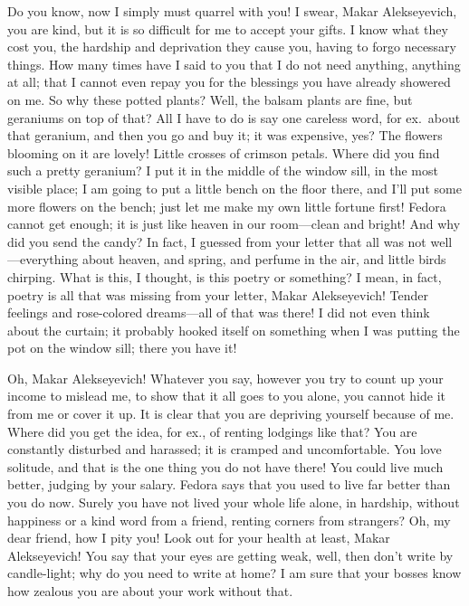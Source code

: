 Do you know, now I simply must quarrel with you! I swear, Makar Alekseyevich, you are kind, but it is so difficult for me to accept your gifts. I know what they cost you, the hardship and deprivation they cause you, having to forgo necessary things. How many times have I said to you that I do not need anything, anything at all; that I cannot even repay you for the blessings you have already showered on me. So why these potted plants? Well, the balsam plants are fine, but geraniums on top of that? All I have to do is say one careless word, for ex.~about that geranium, and then you go and buy it; it was expensive, yes? The flowers blooming on it are lovely! Little crosses of crimson petals. Where did you find such a pretty geranium? I put it in the middle of the window sill, in the most visible place; I am going to put a little bench on the floor there, and I'll put some more flowers on the bench; just let me make my own little fortune first! Fedora cannot get enough; it is just like heaven in our room---clean and bright! And why did you send the candy? In fact, I guessed from your letter that all was not well---everything about heaven, and spring, and perfume in the air, and little birds chirping. What is this, I thought, is this poetry or something? I mean, in fact, poetry is all that was missing from your letter, Makar Alekseyevich! Tender feelings and rose-colored dreams---all of that was there! I did not even think about the curtain; it probably hooked itself on something when I was putting the pot on the window sill; there you have it!

Oh, Makar Alekseyevich! Whatever you say, however you try to count up your income to mislead me, to show that it all goes to you alone, you cannot hide it from me or cover it up. It is clear that you are depriving yourself because of me. Where did you get the idea, for ex., of renting lodgings like that? You are constantly disturbed and harassed; it is cramped and uncomfortable. You love solitude, and that is the one thing you do not have there! You could live much better, judging by your salary. Fedora says that you used to live far better than you do now. Surely you have not lived your whole life alone, in hardship, without happiness or a kind word from a friend, renting corners from strangers? Oh, my dear friend, how I pity you! Look out for your health at least, Makar Alekseyevich! You say that your eyes are getting weak, well, then don't write by candle-light; why do you need to write at home? I am sure that your bosses know how zealous you are about your work without that.

